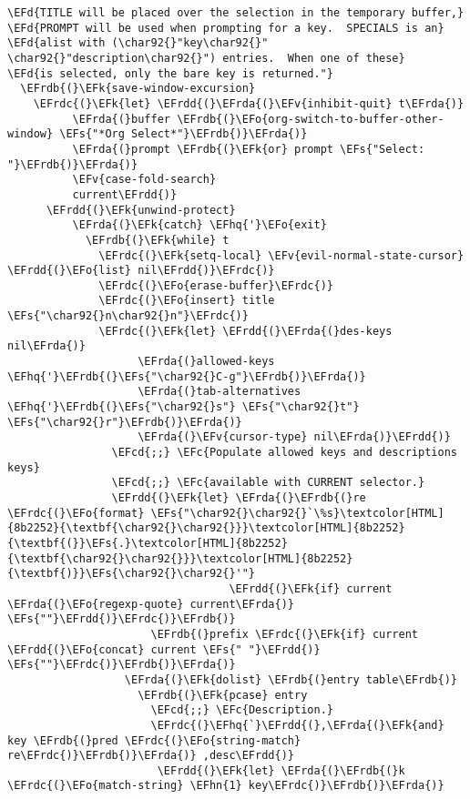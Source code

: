 \documentclass[c]{article}
\theoremstyle{plain}%
\theoremstyle{definition}
\theoremstyle{remark}
\newcommand{\EFc}[1]{\textcolor{EFc}{#1}} %
\newcommand{\EFcd}[1]{\textcolor{EFcd}{#1}} %
\newcommand{\EFs}[1]{\textcolor{EFs}{#1}} %
\newcommand{\EFd}[1]{\textcolor{EFd}{#1}} %
\newcommand{\EFk}[1]{\textcolor{EFk}{#1}} %
\newcommand{\EFv}[1]{\textcolor{EFv}{#1}} %
\newcommand{\EFo}[1]{\textcolor{EFo}{#1}} %
\newcommand{\EFhn}[1]{\textcolor{EFhn}{#1}} %
\newcommand{\EFhq}[1]{\textcolor{EFhq}{#1}} %
\newcommand{\EFrda}[1]{\textcolor{EFrda}{#1}} %
\newcommand{\EFrdb}[1]{\textcolor{EFrdb}{#1}} %
\newcommand{\EFrdc}[1]{\textcolor{EFrdc}{#1}} %
\newcommand{\EFrdd}[1]{\textcolor{EFrdd}{#1}} %
\begin{document}
\begin{Code}
\begin{Verbatim}
\EFd{TITLE will be placed over the selection in the temporary buffer,}
\EFd{PROMPT will be used when prompting for a key.  SPECIALS is an}
\EFd{alist with (\char92{}"key\char92{}" \char92{}"description\char92{}") entries.  When one of these}
\EFd{is selected, only the bare key is returned."}
  \EFrdb{(}\EFk{save-window-excursion}
    \EFrdc{(}\EFk{let} \EFrdd{(}\EFrda{(}\EFv{inhibit-quit} t\EFrda{)}
          \EFrda{(}buffer \EFrdb{(}\EFo{org-switch-to-buffer-other-window} \EFs{"*Org Select*"}\EFrdb{)}\EFrda{)}
          \EFrda{(}prompt \EFrdb{(}\EFk{or} prompt \EFs{"Select: "}\EFrdb{)}\EFrda{)}
          \EFv{case-fold-search}
          current\EFrdd{)}
      \EFrdd{(}\EFk{unwind-protect}
          \EFrda{(}\EFk{catch} \EFhq{'}\EFo{exit}
            \EFrdb{(}\EFk{while} t
              \EFrdc{(}\EFk{setq-local} \EFv{evil-normal-state-cursor} \EFrdd{(}\EFo{list} nil\EFrdd{)}\EFrdc{)}
              \EFrdc{(}\EFo{erase-buffer}\EFrdc{)}
              \EFrdc{(}\EFo{insert} title \EFs{"\char92{}n\char92{}n"}\EFrdc{)}
              \EFrdc{(}\EFk{let} \EFrdd{(}\EFrda{(}des-keys nil\EFrda{)}
                    \EFrda{(}allowed-keys \EFhq{'}\EFrdb{(}\EFs{"\char92{}C-g"}\EFrdb{)}\EFrda{)}
                    \EFrda{(}tab-alternatives \EFhq{'}\EFrdb{(}\EFs{"\char92{}s"} \EFs{"\char92{}t"} \EFs{"\char92{}r"}\EFrdb{)}\EFrda{)}
                    \EFrda{(}\EFv{cursor-type} nil\EFrda{)}\EFrdd{)}
                \EFcd{;;} \EFc{Populate allowed keys and descriptions keys}
                \EFcd{;;} \EFc{available with CURRENT selector.}
                \EFrdd{(}\EFk{let} \EFrda{(}\EFrdb{(}re \EFrdc{(}\EFo{format} \EFs{"\char92{}\char92{}`\%s}\textcolor[HTML]{8b2252}{\textbf{\char92{}\char92{}}}\textcolor[HTML]{8b2252}{\textbf{(}}\EFs{.}\textcolor[HTML]{8b2252}{\textbf{\char92{}\char92{}}}\textcolor[HTML]{8b2252}{\textbf{)}}\EFs{\char92{}\char92{}'"}
                                  \EFrdd{(}\EFk{if} current \EFrda{(}\EFo{regexp-quote} current\EFrda{)} \EFs{""}\EFrdd{)}\EFrdc{)}\EFrdb{)}
                      \EFrdb{(}prefix \EFrdc{(}\EFk{if} current \EFrdd{(}\EFo{concat} current \EFs{" "}\EFrdd{)} \EFs{""}\EFrdc{)}\EFrdb{)}\EFrda{)}
                  \EFrda{(}\EFk{dolist} \EFrdb{(}entry table\EFrdb{)}
                    \EFrdb{(}\EFk{pcase} entry
                      \EFcd{;;} \EFc{Description.}
                      \EFrdc{(}\EFhq{`}\EFrdd{(},\EFrda{(}\EFk{and} key \EFrdb{(}pred \EFrdc{(}\EFo{string-match} re\EFrdc{)}\EFrdb{)}\EFrda{)} ,desc\EFrdd{)}
                       \EFrdd{(}\EFk{let} \EFrda{(}\EFrdb{(}k \EFrdc{(}\EFo{match-string} \EFhn{1} key\EFrdc{)}\EFrdb{)}\EFrda{)}

\end{Verbatim}
\end{Code}
\end{document}
